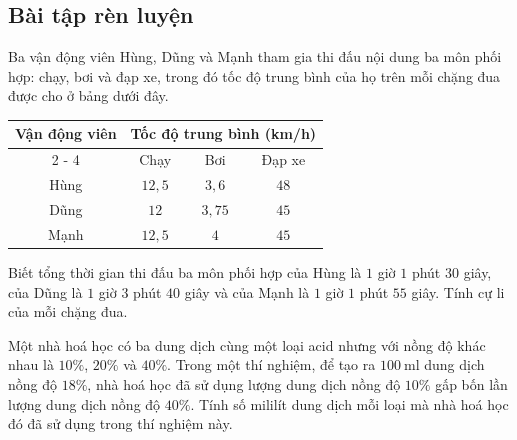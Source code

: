 \begin{bt}
\subsection{Bài tập rèn luyện}
\begin{bt}%
Ba vận động viên Hùng, Dũng và Mạnh tham gia thi đấu nội dung ba môn phối hợp: chạy, bơi và đạp xe, trong đó tốc độ trung bình của họ trên mỗi chặng đua được cho ở bảng dưới đây.\begin{center}
\begin{tabular}{|c|c|c|c|}
	\hline \multirow{2}{*}{ Vận động viên } & \multicolumn{3}{|c|}{ Tốc độ trung bình (km/h) } \\
	\cline { 2 - 4 } & Chạy & Bơi & Đạp xe \\
	\hline Hùng & $12{,}5$ & $3{,}6$ & $48$ \\
	\hline Dũng & $12$ & $3{,}75$ & $45$ \\
	\hline Mạnh & $12{,}5$ & $4$ & $45$ \\
	\hline
\end{tabular}
\end{center}
Biết tổng thời gian thi đấu ba môn phối hợp của Hùng là $1$ giờ $1$ phút $30$ giây, của Dũng là $1$ giờ $3$ phút $40$ giây và của Mạnh là $1$ giờ $1$ phút $55$ giây. Tính cự li của mỗi chặng đua.
\end{bt}
\begin{bt}%
	Một nhà hoá học có ba dung dịch cùng một loại acid nhưng với nồng độ khác nhau là $10 \%$, $20 \%$ và $40 \%$. Trong một thí nghiệm, để tạo ra $100 \mathrm{~ml} $ dung dịch nồng độ $18 \%$, nhà hoá học đã sử dụng lượng dung dịch nồng độ $10 \%$ gấp bốn lần lượng dung dịch nồng độ $40 \%$. Tính số mililít dung dịch mỗi loại mà nhà hoá học đó đã sử dụng trong thí nghiệm này.

\end{bt}
\end{bt}

